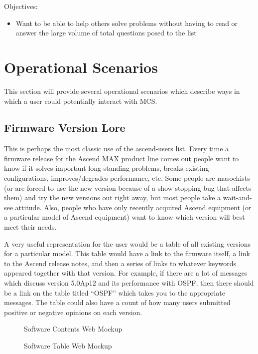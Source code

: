 Objectives:
\begin{itemize}
\item Want to be able to help others solve problems without having to read or
  answer the large volume of total questions posed to the list
\end{itemize}

\section{Operational Scenarios}
\label{sec:op-scenarios}
This section will provide several operational scenarios which describe ways in
which a user could potentially interact with MCS.

\subsection{Firmware Version Lore}
This is perhaps the most classic use of the ascend-users list. Every time a
firmware release for the Ascend MAX product line comes out people want to know
if it solves important long-standing problems, breaks existing configurations,
improves/degrades performance, etc. Some people are masochists (or are forced
to use the new version because of a show-stopping bug that affects them) and
try the new versions out right away, but most people take a wait-and-see
attitude. Also, people who have only recently acquired Ascend equipment (or a
particular model of Ascend equipment) want to know which version will best meet
their needs.

A very useful representation for the user would be a table of all existing
versions for a particular model. This table would have a link to the firmware
itself, a link to the Ascend release notes, and then a series of links to
whatever keywords appeared together with that version. For example, if there
are a lot of messages which discuss version 5.0Ap12 and its performance with
OSPF, then there should be a link on the table titled ``OSPF'' which takes you to
the appropriate messages. The table could also have a count of how many users
submitted positive or negative opinions on each version.

\begin{figure}[htbp]
  {\centerline {}}
  \caption{Software Contents Web Mockup}
  \label{fig:software-contents}
\end{figure}

\begin{figure}[htbp]
  {\centerline {}}
  \caption{Software Table Web Mockup}
  \label{fig:software-table}
\end{figure}

